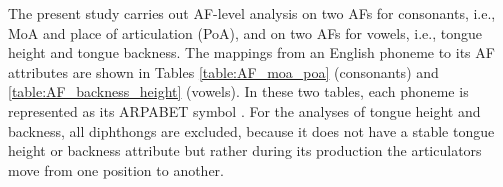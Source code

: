 \documentclass[transmag]{IEEEtran}
\begin{document}

The present study carries out AF-level analysis on two AFs for consonants, i.e.,  MoA and place of articulation (PoA), and on two AFs for vowels, i.e., tongue height and tongue backness. The mappings from an English phoneme to its AF attributes are shown in Tables \ref{table:AF_moa_poa} (consonants) and \ref{table:AF_backness_height} (vowels). 
In these two tables, each phoneme is represented as its ARPABET symbol \cite{wiki:arpabet}.
For the  analyses of tongue height and backness, all diphthongs are excluded, 
because it does not have a stable tongue height or backness attribute but rather during its production the articulators move from one position to another.


\end{document}
